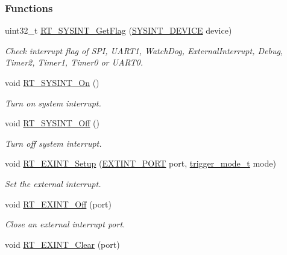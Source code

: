 \subsubsection*{Functions}
\begin{DoxyCompactItemize}
\item 
uint32\+\_\+t \mbox{\hyperlink{a00011_aca7d297005ee41b91c0e638a40bec585}{R\+T\+\_\+\+S\+Y\+S\+I\+N\+T\+\_\+\+Get\+Flag}} (\mbox{\hyperlink{a00011_afa38f6b3d96898de1e521bf88e097a4c}{S\+Y\+S\+I\+N\+T\+\_\+\+D\+E\+V\+I\+CE}} device)
\begin{DoxyCompactList}\small\item\em Check interrupt flag of S\+PI, U\+A\+R\+T1, Watch\+Dog, External\+Interrupt, Debug, Timer2, Timer1, Timer0 or U\+A\+R\+T0. \end{DoxyCompactList}\item 
void \mbox{\hyperlink{a00011_ae38d9088d19c0550caf1dacec0b3475b}{R\+T\+\_\+\+S\+Y\+S\+I\+N\+T\+\_\+\+On}} ()
\begin{DoxyCompactList}\small\item\em Turn on system interrupt. \end{DoxyCompactList}\item 
void \mbox{\hyperlink{a00011_acf51664514fdf6f702d8209e95e445dc}{R\+T\+\_\+\+S\+Y\+S\+I\+N\+T\+\_\+\+Off}} ()
\begin{DoxyCompactList}\small\item\em Turn off system interrupt. \end{DoxyCompactList}\item 
void \mbox{\hyperlink{a00011_ac2664665be12652ffe3d884f1423f672}{R\+T\+\_\+\+E\+X\+I\+N\+T\+\_\+\+Setup}} (\mbox{\hyperlink{a00011_af11f5754cc92430795a63bb53d964cd4}{E\+X\+T\+I\+N\+T\+\_\+\+P\+O\+RT}} port, \mbox{\hyperlink{a00020_a6d33f21be3f0c5cf91c5d638e8aca086}{trigger\+\_\+mode\+\_\+t}} mode)
\begin{DoxyCompactList}\small\item\em Set the external interrupt. \end{DoxyCompactList}\item 
void \mbox{\hyperlink{a00011_a9889abece7fc3ef133b0a93d7b5e54f2}{R\+T\+\_\+\+E\+X\+I\+N\+T\+\_\+\+Off}} (port)
\begin{DoxyCompactList}\small\item\em Close an external interrupt port. \end{DoxyCompactList}\item 
void \mbox{\hyperlink{a00011_a8100842e1feca5062f1712116abe97d0}{R\+T\+\_\+\+E\+X\+I\+N\+T\+\_\+\+Clear}} (port)

\end{DoxyCompactItemize}
